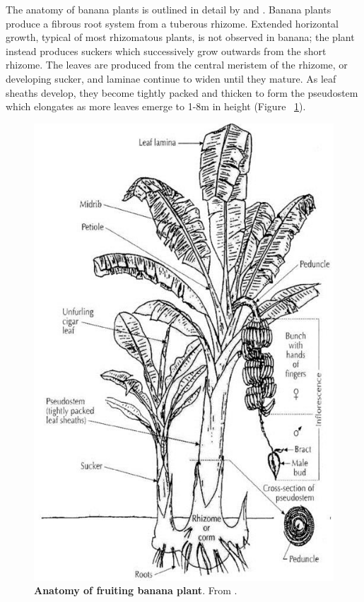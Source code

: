The anatomy of banana plants is outlined in detail by \textcite{Bakry2009} and \textcite{Robinson2010}. Banana plants produce a fibrous root system from a tuberous rhizome. Extended horizontal growth, typical of most rhizomatous plants, is not observed in banana; the plant instead produces suckers which successively grow outwards from the short rhizome. The leaves are produced from the central meristem of the rhizome, or developing sucker, and laminae continue to widen until they mature. As leaf sheaths develop, they become tightly packed and thicken to form the pseudostem which elongates as more leaves emerge to 1-8m in height (Figure ~\ref{fig:Anatomy of fruiting banana plant}). 



\begin{figure}[hp!]
    \centering
    \includegraphics[width=12cm]{Figures/Diagrammatic-representation-of-a-fruiting-banana-plant-with-suckers-in-Bakry-et-al_W640.jpg}
    \caption[Anatomy of fruiting banana plant]{\textbf{Anatomy of fruiting banana plant}. From \textcite{Bakry2009}.}
    \label{fig:Anatomy of fruiting banana plant}
\end{figure}
\clearpage

